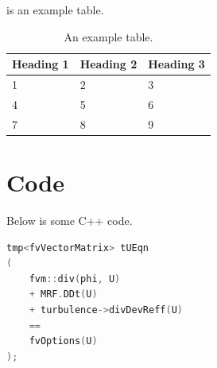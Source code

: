 \documentclass{article}
\begin{document}
     is an example table.

    \begin{table}[h!]
        \caption{An example table.}
        \label{tabletest}
        \begin{center}
            \begin{tabularx}{\textwidth}{ X X X }
                    \toprule
                    Heading 1 & Heading 2 & Heading 3 \\
                    \midrule
                    1 & 2 & 3 \\
                    4 & 5 & 6 \\
                    7 & 8 & 9 \\
                    \bottomrule
            \end{tabularx}
        \end{center}
    \end{table}

    \section{Code}
    Below is some C++ code.
    \begin{lstlisting}[language=C++]
tmp<fvVectorMatrix> tUEqn
(
    fvm::div(phi, U)
    + MRF.DDt(U)
    + turbulence->divDevReff(U)
    ==
    fvOptions(U)
);
\end{lstlisting}


    
    \label{bibsect}
\end{document}
